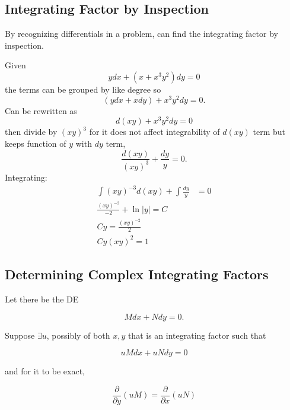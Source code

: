\subsection{Integrating Factor by Inspection}

By recognizing differentials in a problem, can find the integrating factor by inspection.

\begin{example}
    Given
    \begin{equation*}
        ydx+(x+x^3y^2)dy=0
    \end{equation*}
    the terms can be grouped by like degree so
    \begin{equation*}
        (ydx+xdy)+x^3y^2dy=0.
    \end{equation*}
    Can be rewritten as
    \begin{equation*}
        d(xy)+x^3y^2dy=0
    \end{equation*}
    then divide by $(xy)^3$ for it does not affect integrability of $d(xy)$ term but keeps function of $y$ with $dy$ term,
    \begin{equation*}
        \frac{d(xy)}{(xy)^3}+\frac{dy}{y}=0.
    \end{equation*}
    Integrating:
    \begin{align*}
        \int (xy)^{-3}d(xy)+\int \frac{dy}{y}&=0\\
        \frac{(xy)^{-2}}{-2}+\ln|y|=C\\
        Cy=\frac{(xy)^{-2}}{2}\\
        Cy(xy)^2=1
    \end{align*}
\end{example}

\subsection{Determining Complex Integrating Factors}

Let there be the DE

\begin{equation*}
    Mdx+Ndy=0.
\end{equation*}

Suppose $\exists u$, possibly of both $x,y$ that is an integrating factor such that

\begin{equation*}
    uMdx+uNdy=0
\end{equation*}

and for it to be exact,

\begin{equation*}
    \frac{\partial}{\partial y}(uM)=\frac{\partial}{\partial x}(uN)
\end{equation*}

